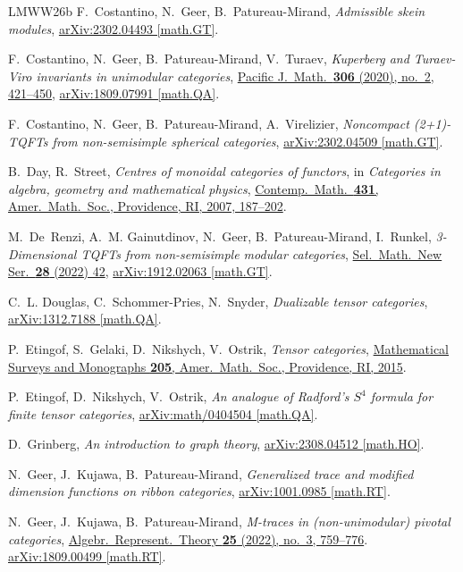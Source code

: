 \documentclass[11pt]{amsart}
\theoremstyle{definition}
\numberwithin{equation}{section}
\newcommand\arxiv[2]      {\href{http://arXiv.org/abs/#1}{arXiv:#2}}
\newcommand\doi[2]        {\href{http://dx.doi.org/#1}{#2}}
\newcommand{\etalchar}[1] {$^{#1}$}
\begin{document}
\begin{thebibliography}{LMWW26b}
F.~Costantino, N.~Geer, B.~Patureau-Mirand,
\textsl{Admissible skein modules},
\arxiv{2302.04493}{2302.04493 [math.GT]}.

F.~Costantino, N.~Geer, B.~Patureau-Mirand, V.~Turaev,
\textsl{Kuperberg and Turaev-Viro invariants in unimodular categories},
\doi{10.2140/pjm.2020.306.421}{Pacific J.\ Math.\ \textbf{306} (2020), no.~2, 421--450},
\arxiv{1809.07991}{1809.07991 [math.QA]}.

F.~Costantino, N.~Geer, B.~Patureau-Mirand, A.~Virelizier,
\textsl{Noncompact (2+1)-TQFTs from non-semisimple spherical categories},
\arxiv{2302.04509}{2302.04509 [math.GT]}.

B.~Day, R.~Street,
\textsl{Centres of monoidal categories of functors},
in \textsl{Categories in algebra, geometry and mathematical physics},
\doi{10.1090/conm/431/08273}{Contemp.\ Math.\ \textbf{431}, Amer.\ Math.\ Soc., Providence, RI, 2007, 187--202}.

\bibitem[DGG{\etalchar{+}}19]{DeRenzi2022}
M.~De~Renzi, A.~M. Gainutdinov, N.~Geer, B.~Patureau-Mirand, I.~Runkel,
\textsl{3-Dimensional TQFTs from non-semisimple modular categories},
\doi{10.1007/s00029-021-00737-z}{Sel.\ Math.\ New Ser.\ \textbf{28} (2022) 42},
\arxiv{1912.02063}{1912.02063 [math.GT]}.

C.~L. Douglas, C.~Schommer-Pries, N.~Snyder,
\textsl{Dualizable tensor categories},
\arxiv{1312.7188}{1312.7188 [math.QA]}.

P.~Etingof, S.~Gelaki, D.~Nikshych, V.~Ostrik,
\textsl{Tensor categories},
\doi{10.1090/surv/205}{Mathematical Surveys and Monographs \textbf{205}, Amer.\ Math.\ Soc., Providence, RI, 2015}.

P.~Etingof, D.~Nikshych, V.~Ostrik,
\textsl{An analogue of Radford's $S^4$ formula for finite tensor categories},
\arxiv{math/0404504}{math/0404504 [math.QA]}.

D.~Grinberg,
\textsl{An introduction to graph theory},
\arxiv{2308.04512}{2308.04512 [math.HO]}.

N.~Geer, J.~Kujawa, B.~Patureau-Mirand,
\textsl{Generalized trace and modified dimension functions on ribbon categories},
\arxiv{1001.0985}{1001.0985 [math.RT]}.

N.~Geer, J.~Kujawa, B.~Patureau-Mirand,
\textsl{M-traces in (non-unimodular) pivotal categories},
\doi{10.1007/s10468-021-10044-y}{Algebr.\ Represent.\ Theory \textbf{25} (2022), no.~3, 759--776}.
\arxiv{1809.00499}{1809.00499 [math.RT]}.


\end{thebibliography}
\end{document}

